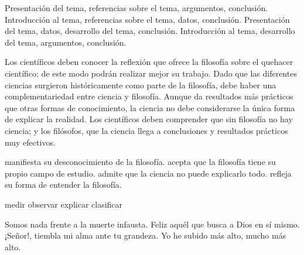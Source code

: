 \documentclass[10pt,a4paper]{article}
\begin{document}
\begin{multicols*}{2}
\opciones
{Presentación del tema, referencias
sobre el tema, argumentos,
conclusión.}
{Introducción al tema, referencias
sobre el tema, datos, conclusión.}
{Presentación del tema, datos,
desarrollo del tema, conclusión.}
{Introducción al tema, desarrollo del
tema, argumentos, conclusión.}

\opciones
{Los científicos deben conocer la
reflexión que ofrece la filosofía sobre
el quehacer científico; de este modo
podrán realizar mejor su trabajo.}
{Dado que las diferentes ciencias
surgieron históricamente como parte
de la filosofía, debe haber una
complementariedad entre ciencia y
filosofía.}
{Aunque da resultados más prácticos
que otras formas de conocimiento, la
ciencia no debe considerarse la única
forma de explicar la realidad.}
{Los científicos deben comprender
que sin filosofía no hay ciencia; y los
filósofos, que la ciencia llega a
conclusiones y resultados prácticos
muy efectivos.}

\opciones
{manifiesta su desconocimiento de la
filosofía.}
{acepta que la filosofía tiene su propio
campo de estudio.}
{admite que la ciencia no puede
explicarlo todo.}
{refleja su forma de entender la
filosofía.}

\opciones
{medir}
{observar}
{explicar}
{clasificar}

\opciones
{Somos nada frente a la muerte
infausta.}
{Feliz aquél que busca a Dios en sí
mismo.}
{¡Señor!, tiembla mi alma ante tu
grandeza.}
{Yo he subido más alto, mucho más
alto.}


\end{multicols*}
\end{document}
